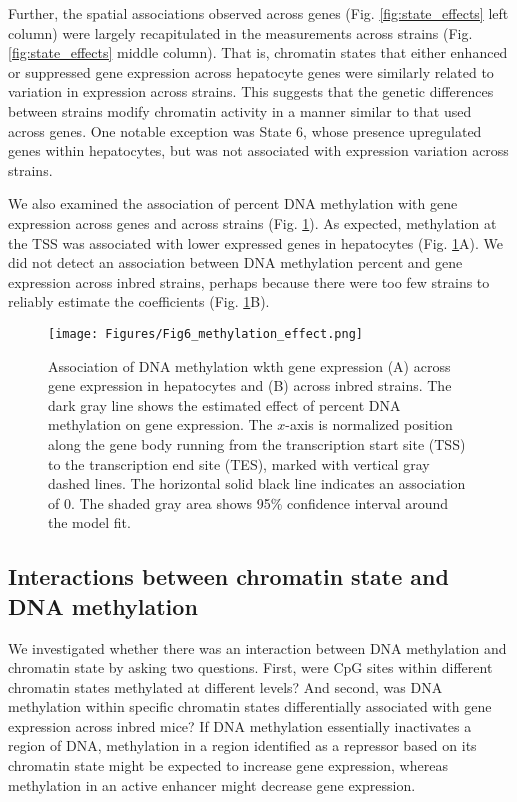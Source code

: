 \documentclass[
  11pt,
]{article}
\begin{document}
Further, the spatial associations observed across genes (Fig.
\ref{fig:state_effects} left column) were largely recapitulated in the
measurements across strains (Fig. \ref{fig:state_effects} middle
column). That is, chromatin states that either enhanced or suppressed
gene expression across hepatocyte genes were similarly related to
variation in expression across strains. This suggests that the genetic
differences between strains modify chromatin activity in a manner
similar to that used across genes. One notable exception was State 6,
whose presence upregulated genes within hepatocytes, but was not
associated with expression variation across strains.

We also examined the association of percent DNA methylation with gene
expression across genes and across strains (Fig.
\ref{fig:DNA_methylation_effect}). As expected, methylation at the TSS
was associated with lower expressed genes in hepatocytes (Fig.
\ref{fig:DNA_methylation_effect}A). We did not detect an association
between DNA methylation percent and gene expression across inbred
strains, perhaps because there were too few strains to reliably estimate
the coefficients (Fig. \ref{fig:DNA_methylation_effect}B).

\begin{figure}[ht!]
\texttt{[image: Figures/Fig6\_methylation\_effect.png]} 
\caption{Association of DNA methylation wkth gene expression (A) across 
gene expression in hepatocytes and (B) across inbred strains. The dark 
gray line shows the estimated effect of percent DNA methylation on gene 
expression. The $x$-axis is normalized position along the gene body 
running from the transcription start site (TSS) to the transcription 
end site (TES), marked with vertical gray dashed lines. The horizontal 
solid black line indicates an association of 0. The shaded gray area shows 
95\% confidence interval around the model fit.}
\label{fig:DNA_methylation_effect}
\end{figure}

\hypertarget{interactions-between-chromatin-state-and-dna-methylation}{%
\subsection{Interactions between chromatin state and DNA
methylation}\label{interactions-between-chromatin-state-and-dna-methylation}}

We investigated whether there was an interaction between DNA methylation
and chromatin state by asking two questions. First, were CpG sites
within different chromatin states methylated at different levels? And
second, was DNA methylation within specific chromatin states
differentially associated with gene expression across inbred mice? If
DNA methylation essentially inactivates a region of DNA, methylation in
a region identified as a repressor based on its chromatin state might be
expected to increase gene expression, whereas methylation in an active
enhancer might decrease gene expression.
\end{document}
